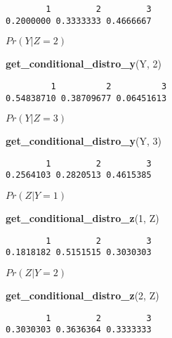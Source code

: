 \documentclass[
]{article}
\newenvironment{Shaded}{\begin{snugshade}}{\end{snugshade}}
\newcommand{\DecValTok}[1]{\textcolor[rgb]{0.00,0.00,0.81}{#1}}
\newcommand{\FunctionTok}[1]{\textcolor[rgb]{0.13,0.29,0.53}{\textbf{#1}}}
\newcommand{\NormalTok}[1]{#1}
\begin{document}
\begin{verbatim}
        1         2         3 
0.2000000 0.3333333 0.4666667 
\end{verbatim}

\(Pr(Y | Z=2)\)

\begin{Shaded}
\begin{Highlighting}[]
\FunctionTok{get\_conditional\_distro\_y}\NormalTok{(Y, }\DecValTok{2}\NormalTok{)}
\end{Highlighting}
\end{Shaded}

\begin{verbatim}
         1          2          3 
0.54838710 0.38709677 0.06451613 
\end{verbatim}

\(Pr(Y | Z=3)\)

\begin{Shaded}
\begin{Highlighting}[]
\FunctionTok{get\_conditional\_distro\_y}\NormalTok{(Y, }\DecValTok{3}\NormalTok{)}
\end{Highlighting}
\end{Shaded}

\begin{verbatim}
        1         2         3 
0.2564103 0.2820513 0.4615385 
\end{verbatim}

\(Pr(Z | Y=1)\)

\begin{Shaded}
\begin{Highlighting}[]
\FunctionTok{get\_conditional\_distro\_z}\NormalTok{(}\DecValTok{1}\NormalTok{, Z)}
\end{Highlighting}
\end{Shaded}

\begin{verbatim}
        1         2         3 
0.1818182 0.5151515 0.3030303 
\end{verbatim}

\(Pr(Z | Y=2)\)

\begin{Shaded}
\begin{Highlighting}[]
\FunctionTok{get\_conditional\_distro\_z}\NormalTok{(}\DecValTok{2}\NormalTok{, Z)}
\end{Highlighting}
\end{Shaded}

\begin{verbatim}
        1         2         3 
0.3030303 0.3636364 0.3333333 
\end{verbatim}
\end{document}
